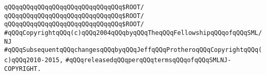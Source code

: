 \newline
\verb|qQQqqQQqqQQqqQQqqQQqqQQqqQQqqQQq$ROOT/|\newline
\newline
\verb|qQQqqQQqqQQqqQQqqQQqqQQqqQQqqQQq$ROOT/|\newline
\verb|qQQqqQQqqQQqqQQqqQQqqQQqqQQqqQQq$ROOT/|\newline
\newline
\newline
\verb|#qQQqCopyrightqQQq(c)qQQq2004qQQqbyqQQqTheqQQqFellowshipqQQqofqQQqSML/NJ|\newline
\verb|#qQQqSubsequentqQQqchangesqQQqbyqQQqJeffqQQqProtheroqQQqCopyrightqQQq(c)qQQq2010-2015,|\newline
\verb|#qQQqreleasedqQQqperqQQqtermsqQQqofqQQqSMLNJ-COPYRIGHT.|\newline

